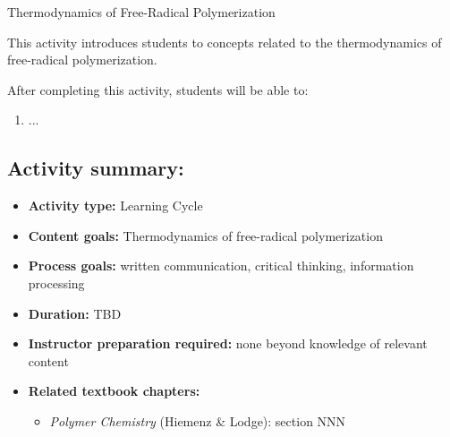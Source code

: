 %
%
%
%

\renewcommand{\figpath}{content/polymchem/freeradical/FRPthermo/figs}
\renewcommand{\labelbase}{FRPthermo}

\begin{activity}{Thermodynamics of Free-Radical Polymerization}

\begin{instructornotes}
	This activity introduces students to concepts related to the thermodynamics of free-radical polymerization.
	
	After completing this activity, students will be able to:
	\begin{enumerate}
		\item ...
	\end{enumerate}
	
	\subsection*{Activity summary:}
	\begin{itemize}
		\item \textbf{Activity type:} Learning Cycle
		\item \textbf{Content goals:} Thermodynamics of free-radical polymerization
		\item \textbf{Process goals:} %
			written communication, critical thinking, information processing
		\item \textbf{Duration:} TBD
		\item \textbf{Instructor preparation required:} none beyond knowledge of relevant content
		\item \textbf{Related textbook chapters:}
			\begin{itemize}
				\item \emph{Polymer Chemistry} (Hiemenz \& Lodge): section NNN
			\end{itemize}
	\end{itemize}
	

\end{instructornotes}
\end{activity}
